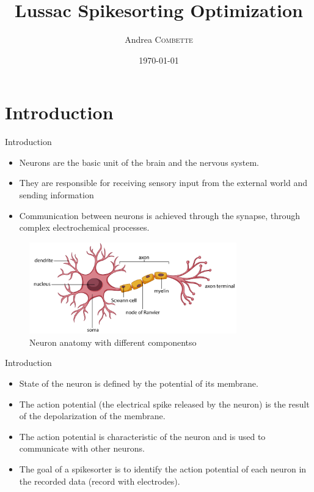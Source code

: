 \documentclass[numbering=fraction]{beamer}
\title{Lussac Spikesorting Optimization}\author{Andrea \textsc{Combette}}
\institute{ENS ULM}
\date{\today{}}
\begin{document}
\begin{frame}
    \titlepage
\end{frame}
\section{Introduction}
\begin{frame}{Introduction}
    \begin{itemize}
        \item Neurons are the basic unit of the brain and the nervous system.
        \item They are responsible for receiving sensory input from the external world and sending information
        \item Communication between neurons is achieved through the synapse, through complex electrochemical processes.
    \end{itemize}
    \begin{figure}
        \centering
        \includegraphics[width=0.8\textwidth]{./figure/neuron_anat.jpg}
        \caption{Neuron anatomy with different componentso}
    \end{figure}
\end{frame}
\begin{frame}{Introduction}
    \begin{itemize}
        \item State of the neuron is defined by the potential of its membrane.
        \item The action potential (the electrical spike released by the neuron) is the result of the depolarization of the membrane.
        \item The action potential is characteristic of the neuron and is used to communicate with other neurons.
        \item The goal of a spikesorter is to identify the action potential of each neuron in the recorded data (record with electrodes).
    \end{itemize}
\end{frame}
\end{document}
